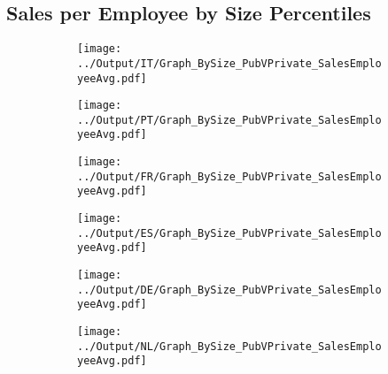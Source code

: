 \documentclass[12pt,notitlepage]{article}
\begin{document}
\subsection{Sales per Employee by Size Percentiles}
\begin{figure}[!htpb]
\centering
\begin{subfigure}{.49\textwidth}
    \centering
 \texttt{[image: ../Output/IT/Graph\_BySize\_PubVPrivate\_SalesEmployeeAvg.pdf]}
\end{subfigure}%
\begin{subfigure}{.49\textwidth}
    \centering
 \texttt{[image: ../Output/PT/Graph\_BySize\_PubVPrivate\_SalesEmployeeAvg.pdf]}
\end{subfigure}
\begin{subfigure}{.49\textwidth}
    \centering
 \texttt{[image: ../Output/FR/Graph\_BySize\_PubVPrivate\_SalesEmployeeAvg.pdf]}
\end{subfigure}%
\begin{subfigure}{.49\textwidth}
    \centering
 \texttt{[image: ../Output/ES/Graph\_BySize\_PubVPrivate\_SalesEmployeeAvg.pdf]}
\end{subfigure}
\begin{subfigure}{.49\textwidth}
    \centering
 \texttt{[image: ../Output/DE/Graph\_BySize\_PubVPrivate\_SalesEmployeeAvg.pdf]}
\end{subfigure}
\begin{subfigure}{.49\textwidth}
    \centering
 \texttt{[image: ../Output/NL/Graph\_BySize\_PubVPrivate\_SalesEmployeeAvg.pdf]}
\end{subfigure}
\end{figure}
\clearpage
\end{document}
